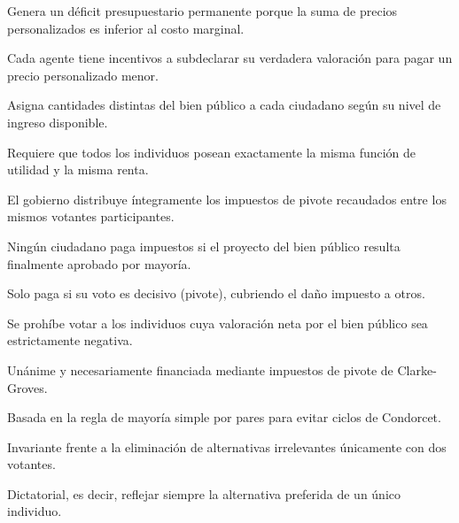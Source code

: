\begin{opts}
    \item Genera un déficit presupuestario permanente porque la suma de precios personalizados es inferior al costo marginal.
    \item Cada agente tiene incentivos a subdeclarar su verdadera valoración para pagar un precio personalizado menor.
    \item Asigna cantidades distintas del bien público a cada ciudadano según su nivel de ingreso disponible.
    \item Requiere que todos los individuos posean exactamente la misma función de utilidad y la misma renta.
\end{opts}

\begin{opts}
    \item El gobierno distribuye íntegramente los impuestos de pivote recaudados entre los mismos votantes participantes.
    \item Ningún ciudadano paga impuestos si el proyecto del bien público resulta finalmente aprobado por mayoría.
    \item Solo paga si su voto es decisivo (pivote), cubriendo el daño impuesto a otros.
    \item Se prohíbe votar a los individuos cuya valoración neta por el bien público sea estrictamente negativa.
\end{opts}

\begin{opts}
    \item Unánime y necesariamente financiada mediante impuestos de pivote de Clarke-Groves.
    \item Basada en la regla de mayoría simple por pares para evitar ciclos de Condorcet.
    \item Invariante frente a la eliminación de alternativas irrelevantes únicamente con dos votantes.
    \item Dictatorial, es decir, reflejar siempre la alternativa preferida de un único individuo.
\end{opts}

